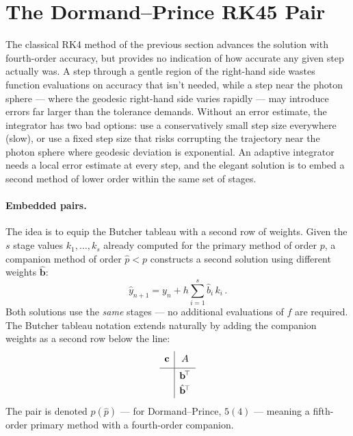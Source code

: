 \section{The Dormand--Prince RK45 Pair}
\label{sec:rk-dormand-prince}

The classical RK4 method of the previous section advances the solution
with fourth-order accuracy, but provides no indication of how accurate
any given step actually was.  A step through a gentle region of the
right-hand side wastes function evaluations on accuracy that isn't
needed, while a step near the photon sphere --- where the geodesic
right-hand side varies rapidly --- may introduce errors far larger
than the tolerance demands.  Without an error estimate, the integrator
has two bad options: use a conservatively small step size everywhere
(slow), or use a fixed step size that risks corrupting the trajectory
near the photon sphere where geodesic deviation is exponential.  An
adaptive integrator needs a local error estimate at every step, and the
elegant solution is to embed a second method of lower order within the
same set of stages.

\paragraph{Embedded pairs.}

The idea is to equip the Butcher tableau with a second row of weights.
Given the $s$ stage values $k_1, \ldots, k_s$ already computed for the
primary method of order $p$, a companion method of order $\hat{p} < p$
constructs a second solution using different weights
$\hat{\mathbf{b}}$:
%
\begin{equation}
  \hat{y}_{n+1} = y_n + h \sum_{i=1}^{s} \hat{b}_i\,k_i \,.
  \label{eq:embedded-companion}
\end{equation}
%
Both solutions use the \emph{same} stages --- no additional evaluations
of $f$ are required.  The Butcher tableau notation extends naturally by
adding the companion weights as a second row below the line:
%
\begin{equation}
  \renewcommand{\arraystretch}{1.3}
  \begin{array}{c|c}
    \mathbf{c} & A \\[2pt]
    \hline
    & \mathbf{b}^{\!\top} \\
    & \hat{\mathbf{b}}^{\!\top}
  \end{array}
  \label{eq:embedded-tableau}
\end{equation}
%
The pair is denoted $p(\hat{p})$ --- for Dormand--Prince, $5(4)$ ---
meaning a fifth-order primary method with a fourth-order companion.

